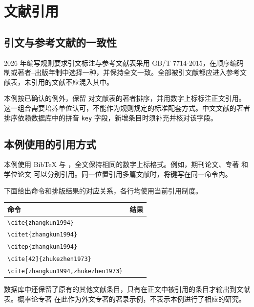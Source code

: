 
\chapter{文献引用}

\section{引文与参考文献的一致性}

2026 年编写规则要求引文标注与参考文献表采用 GB/T 7714-2015，在顺序编码制或著者--出版年制中选择一种，并保持全文一致。全部被引文献都应进入参考文献表，未引用的文献不应混入其中。

本例按已确认的例外，保留  对文献表的著者排序，并用数字上标标注正文引用。这一组合需要培养单位认可，不能作为规则规定的标准配套方式。中文文献的著者排序依赖数据库中的拼音 \texttt{key} 字段，新增条目时须补充并核对该字段。

\section{本例使用的引用方式}

本例使用 BibTeX 与 ，全文保持相同的数字上标格式。例如，期刊论文\cite{zhangkun1994}、专著\cite{zhukezhen1973} 和学位论文\cite{zhengkaiqing1987} 可以分别引用。同一位置引用多篇文献时，将键写在同一命令内\cite{zhangkun1994,zhukezhen1973}。

下面给出命令和排版结果的对应关系，各行均使用当前引用制度。
\begin{center}
  \begin{tabular}{ll}
    \toprule
    命令 & 结果 \\
    \midrule
    \verb|\cite{zhangkun1994}| & \cite{zhangkun1994} \\
    \verb|\citet{zhangkun1994}|              & \citet{zhangkun1994}              \\
    \verb|\citep{zhangkun1994}|              & \citep{zhangkun1994}              \\
    \verb|\cite[42]{zhukezhen1973}| & \cite[42]{zhukezhen1973} \\
    \verb|\cite{zhangkun1994,zhukezhen1973}| & \cite{zhangkun1994,zhukezhen1973} \\
    \bottomrule
  \end{tabular}
\end{center}

数据库中还保留了原有的其他文献条目，只有在正文中被引用的条目才输出到文献表。概率论专著\cite{peebles2001probability} 在此作为外文专著的著录示例，不表示本例进行了相应的研究。

